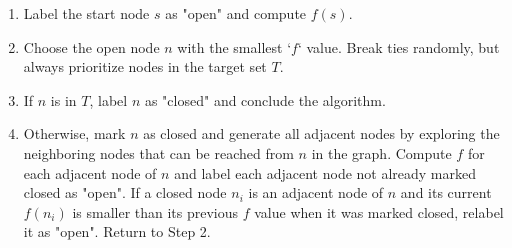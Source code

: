     \begin{enumerate}
        \item Label the start node $s$ as "open" and compute $f(s)$.
        \item Choose the open node $n$ with the smallest `$f$` value. Break ties randomly, but always prioritize nodes in the target set $T$.
        \item If $n$ is in $T$, label $n$ as "closed" and conclude the algorithm.
        \item Otherwise, mark $n$ as closed and generate all adjacent nodes by exploring the neighboring nodes that can be reached from $n$ in the graph. Compute $f$ for each adjacent node of $n$ and label each adjacent node not already marked closed as "open". If a closed node $n_i$ is an adjacent node of $n$ and its current $f(n_{i})$ is smaller than its previous $f$ value when it was marked closed, relabel it as "open". Return to Step 2.
    \end{enumerate}

